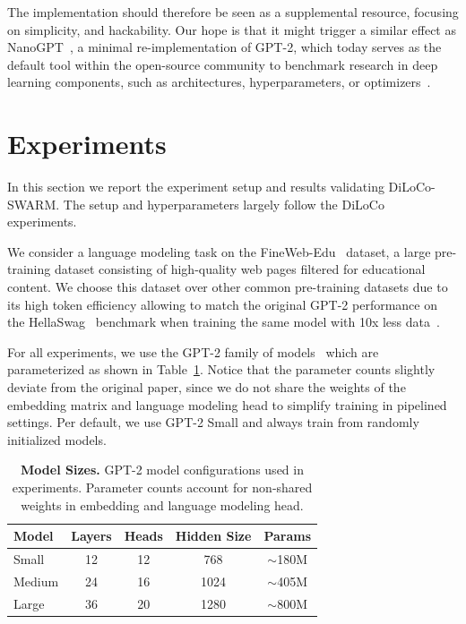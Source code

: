 \documentclass{article}
\begin{document}
The implementation should therefore be seen as a supplemental resource, focusing
on simplicity, and hackability. Our hope is that it might trigger a similar
effect as NanoGPT~\cite{karpathy2024nanogpt}, a minimal re-implementation of
GPT-2, which today serves as the default tool within the open-source community
to
benchmark research in deep learning components, such as architectures,
hyperparameters, or optimizers~\cite{moddednanogpt2024}.

\section{Experiments}

In this section we report the experiment setup and results validating
DiLoCo-SWARM. The setup and hyperparameters largely follow the
DiLoCo~\cite{douillard2023diloco} experiments.

We consider a language modeling task on the FineWeb-Edu~\cite{penedo2024fineweb}
dataset, a large pre-training dataset consisting of high-quality web pages
filtered for educational content. We choose this dataset over other common
pre-training datasets due to its high token efficiency allowing to match the
original GPT-2 performance on the
HellaSwag~\cite{zellers2019hellaswag} benchmark when training the same model with 10x
less data~\cite{karpathy2024nanogpt}.

For all experiments, we use the GPT-2 family of models~\cite{radford2019gpt2} which
are parameterized as shown in Table~\ref{tab:models}. Notice that the parameter 
counts slightly deviate from the original paper, since we do not share the 
weights of the embedding matrix and language modeling head to simplify training
in pipelined settings. Per default, we use GPT-2 Small and always train from 
randomly initialized models.

\begin{table}[h]
\centering
\begin{tabular}{lcccc}
\toprule
\textbf{Model} & \textbf{Layers} & \textbf{Heads} & \textbf{Hidden Size} & \textbf{Params} \\
\midrule
Small & 12 & 12 & 768 & $\sim$180M \\
Medium & 24 & 16 & 1024 & $\sim$405M \\
Large & 36 & 20 & 1280 & $\sim$800M \\
\bottomrule
\end{tabular}
\caption{\textbf{Model Sizes.} GPT-2 model configurations used in experiments.
Parameter counts account for non-shared weights in embedding and language
modeling head.}
\label{tab:models}
\end{table}
\end{document}
